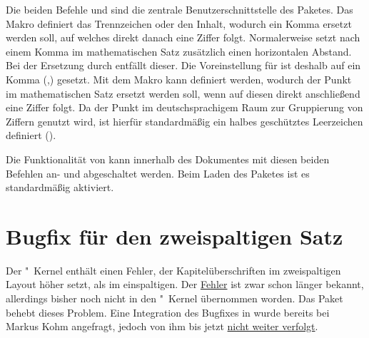 \begin{DeclareEntity}{}
\begin{Declaration}
  {}
\begin{Declaration}
  {}
\printdeclarationlist
%
Die beiden Befehle  und  sind die zentrale 
Benutzerschnittstelle des Paketes. Das Makro  definiert das 
Trennzeichen oder den Inhalt, wodurch ein Komma ersetzt werden soll, auf 
welches direkt danach eine Ziffer folgt. Normalerweise setzt 
nach einem Komma im mathematischen Satz zusätzlich einen horizontalen Abstand.
Bei der Ersetzung durch  entfällt dieser. Die Voreinstellung
für  ist deshalb auf ein Komma (,) gesetzt. Mit dem Makro 
 kann definiert werden, wodurch der Punkt im mathematischen 
Satz ersetzt werden soll, wenn auf diesen direkt anschließend eine Ziffer 
folgt. Da der Punkt im deutschsprachigem Raum zur Gruppierung von Ziffern 
genutzt wird, ist hierfür standardmäßig ein halbes geschütztes Leerzeichen 
definiert (\Macro*{,}).
\end{Declaration}
\end{Declaration}

\begin{Declaration}
  {}
\begin{Declaration}
  {}
\printdeclarationlist
%
%
Die Funktionalität von  kann innerhalb des Dokumentes mit 
diesen beiden Befehlen an- und abgeschaltet werden. Beim Laden des Paketes ist 
es standardmäßig aktiviert.%
\end{Declaration}
\end{Declaration}
%
%
\end{DeclareEntity}



\section[%
  Das Paket \Package{twocolfix} -- Bugfix für den zweispaltigen Satz%
]{%
  Bugfix für den zweispaltigen Satz%
}
%
\begin{DeclareEntity}{}
Der "~Kernel enthält einen Fehler, der Kapitelüberschriften im
zweispaltigen Layout höher setzt, als im einspaltigen. Der 
\href{http://www.latex-project.org/cgi-bin/ltxbugs2html?pr=latex/3126}{Fehler}
ist zwar schon länger bekannt, allerdings bisher noch nicht in den 
"~Kernel übernommen worden. Das Paket  behebt 
dieses Problem. Eine Integration des Bugfixes in \KOMAScript wurde bereits bei 
Markus Kohm angefragt, jedoch von ihm bis jetzt 
\href{http://www.komascript.de/node/1681}{nicht weiter verfolgt}.
\end{DeclareEntity}


